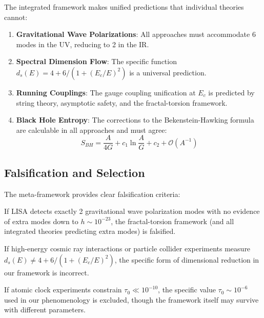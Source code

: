 The integrated framework makes unified predictions that individual theories cannot:

\begin{enumerate}
    \item \textbf{Gravitational Wave Polarizations}: All approaches must accommodate 6 modes in the UV, reducing to 2 in the IR.
    
    \item \textbf{Spectral Dimension Flow}: The specific function $d_s(E) = 4 + 6/(1+(E_c/E)^2)$ is a universal prediction.
    
    \item \textbf{Running Couplings}: The gauge coupling unification at $E_c$ is predicted by string theory, asymptotic safety, and the fractal-torsion framework.
    
    \item \textbf{Black Hole Entropy}: The corrections to the Bekenstein-Hawking formula are calculable in all approaches and must agree:
    \begin{equation}
        S_{BH} = \frac{A}{4G} + c_1 \ln\frac{A}{G} + c_2 + \mathcal{O}(A^{-1})
    \end{equation}
\end{enumerate}

\subsection{Falsification and Selection}

The meta-framework provides clear falsification criteria:

\begin{test}
If LISA detects exactly 2 gravitational wave polarization modes with no evidence of extra modes down to $h \sim 10^{-23}$, the fractal-torsion framework (and all integrated theories predicting extra modes) is falsified.
\end{test}

\begin{test}
If high-energy cosmic ray interactions or particle collider experiments measure $d_s(E) \neq 4 + 6/(1+(E_c/E)^2)$, the specific form of dimensional reduction in our framework is incorrect.
\end{test}

\begin{test}
If atomic clock experiments constrain $\tau_0 \ll 10^{-10}$, the specific value $\tau_0 \sim 10^{-6}$ used in our phenomenology is excluded, though the framework itself may survive with different parameters.
\end{test}

